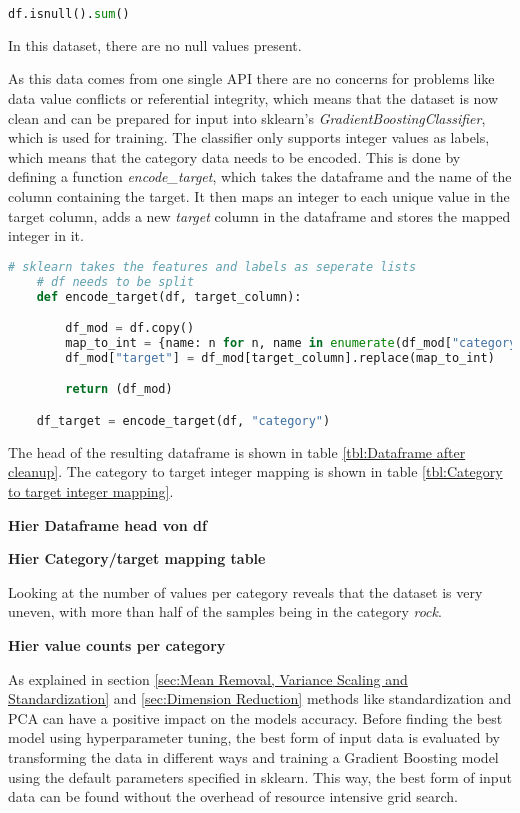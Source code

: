 \begin{lstlisting}[language=Python]
    df.isnull().sum()
\end{lstlisting}

In this dataset, there are no null values present.

As this data comes from one single API there are no concerns for problems like data value conflicts or
referential integrity, which means that the dataset is now clean and can be prepared for input into sklearn's
\emph{GradientBoostingClassifier}, which is used for training.
The classifier only supports integer values as labels, which means that the category data needs to be encoded.
This is done by defining a function \emph{encode\_target}, which takes the dataframe and the name of the column containing
the target. It then maps an integer to each unique value in the target column, adds a new \emph{target} column in the
dataframe and stores the mapped integer in it.

\begin{lstlisting}[language=Python]
    # sklearn takes the features and labels as seperate lists
    # df needs to be split
    def encode_target(df, target_column):

        df_mod = df.copy()
        map_to_int = {name: n for n, name in enumerate(df_mod["category"].unique())}
        df_mod["target"] = df_mod[target_column].replace(map_to_int)

        return (df_mod)

    df_target = encode_target(df, "category")
\end{lstlisting}

The head of the resulting dataframe is shown in table \ref{tbl:Dataframe after cleanup}. The category to target integer mapping is shown in table \ref{tbl:Category to target integer mapping}.

\textbf{Hier Dataframe head von df}
\label{tbl:Dataframe after cleanup}

\textbf{Hier Category/target mapping table}
\label{tbl:Category to target integer mapping}

Looking at the number of values per category reveals that the dataset is very uneven, with more than half of
the samples being in the category \emph{rock}.

\textbf{Hier value counts per category}

As explained in section \ref{sec:Mean Removal, Variance Scaling and Standardization} and \ref{sec:Dimension Reduction}
methods like standardization and \ac{PCA} can have a positive impact on the models accuracy.
Before finding the best model using hyperparameter tuning, the best form of input data is evaluated by transforming
the data in different ways and training a Gradient Boosting model using the default parameters specified in sklearn.
This way, the best form of input data can be found without the overhead of resource intensive grid search.

